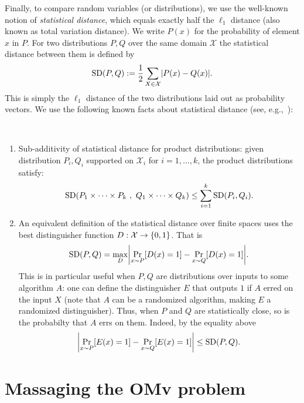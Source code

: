 \documentclass[letter,11pt]{article}
\newcommand{\omv}{\textnormal{\textsf{OMv}}\xspace}
\begin{document}
Finally, to compare random variables (or distributions), we use the well-known notion of \emph{statistical distance}, which equals exactly half the $\ell_1$ distance (also known as total variation distance).
We write $P(x)$ for the probability of element $x$ in $P$. For two distributions $P, Q$ over the same domain $\mathcal{X}$ the statistical distance between them is defined by
\[
    \sd{P}{Q} :=
    \frac{1}{2}\sum_{X \in \mathcal{X}} \card{P(x) - Q(x)} .
\]
This is simply the $\ell_1$ distance of the two distributions laid out as probability vectors. We use the following known facts about statistical distance (see, e.g.,~\cite{CT2001}):
\begin{fact}
    \label{fact:SD_properties}~
    \begin{enumerate}
        \item
        \label{fact:item:SD_subadditivity}
        Sub-additivity of statistical distance for product distributions: given distribution $P_i, Q_i$ supported on $\mathcal{X}_i$ for $i=1, \dots, k$, the product distributions satisfy:
        \[
            \sd{P_1 \times \dots \times P_k\ }{\ Q_1 \times \dots \times Q_k}
            \leq \sum_{i=1}^{k} \sd{P_i}{Q_i} .
        \]
     

        \item
        \label{fact:item:SD_error_difference}
        An equivalent definition of the statistical distance over finite spaces uses the best distinguisher function     $D:\mathcal{X} \to \{0,1\}$. That is
        \[
            \sd{P}{Q} = \max_{D} \card{\Prob{x\sim P}{D(x) = 1} - \Prob{x \sim Q}{D(x) = 1}} .
        \]
        This is in particular useful when $P, Q$ are distributions over inputs to some algorithm $A$: one can define the distinguisher $E$ that outputs $1$ if $A$ erred on the input $X$ (note that $A$ can be a randomized algorithm, making $E$ a randomized distinguisher).
        Thus, when $P$ and $Q$ are statistically close, so is the probabilty that $A$ errs on them. Indeed, by the equality above
        \[
            \card{\Prob{x\sim P}{E(x) = 1} - \Prob{x \sim Q}{E(x) = 1}}
            \leq \sd{P}{Q} .
        \]
    \end{enumerate}
\end{fact}




\section{Massaging the \omv problem}
\label{app: from omv to parity oumv}
\end{document}
